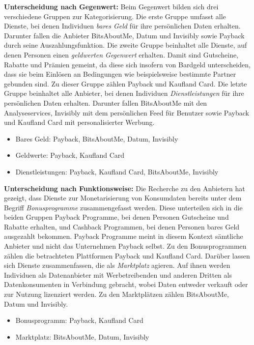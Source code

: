 \noindent \textbf{Unterscheidung nach Gegenwert:} Beim Gegenwert bilden sich drei verschiedene Gruppen zur Kategorisierung. Die erste Gruppe umfasst alle Dienste, bei denen Individuen \textit{bares Geld} für ihre persönlichen Daten erhalten. Darunter fallen die Anbieter BitsAboutMe, Datum und Invisibly sowie Payback durch seine Auszahlungsfunktion. Die zweite Gruppe beinhaltet alle Dienste, auf denen Personen einen \textit{geldwerten Gegenwert} erhalten. Damit sind Gutscheine, Rabatte und Prämien gemeint, da diese sich insofern von Bardgeld unterscheiden, dass sie beim Einlösen an Bedingungen wie beispielsweise bestimmte Partner gebunden sind. Zu dieser Gruppe zählen Payback und Kaufland Card. Die letzte Gruppe beinhaltet alle Anbieter, bei denen Individuen \textit{Dienstleistungen} für ihre persönlichen Daten erhalten. Darunter fallen BitsAboutMe mit den Analyseservices, Invisibly mit dem persönlichen Feed für Benutzer sowie Payback und Kaufland Card mit personalisierter Werbung.
\begin{itemize}
    \item Bares Geld: Payback, BitsAboutMe, Datum, Invisibly
    \item Geldwerte: Payback, Kaufland Card
    \item Dienstleistungen: Payback, Kaufland Card, BitsAboutMe, Invisibly
\end{itemize}

\noindent \textbf{Unterscheidung nach Funktionsweise:} Die Recherche zu den Anbietern hat gezeigt, dass Dienste zur Monetarisierung von Konsumdaten bereits unter dem Begriff \textit{Bonusprogramme} zusammengefasst werden. Diese unterteilen sich in die beiden Gruppen Payback Programme, bei denen Personen Gutscheine und Rabatte erhalten, und Cashback Programmen, bei denen Personen bares Geld ausgezahlt bekommen. Payback Programme meint in diesem Kontext sämtliche Anbieter und nicht das Unternehmen Payback selbst. Zu den Bonusprogrammen zählen die betrachteten Plattformen Payback und Kaufland Card. Darüber lassen sich Dienste zusammenfassen, die als \textit{Marktplatz} agieren. Auf ihnen werden Individuen als Datenanbieter mit Werbetreibenden und anderen Dritten als Datenkonsumenten in Verbindung gebracht, wobei Daten entweder verkauft oder zur Nutzung lizenziert werden. Zu den Marktplätzen zählen BitsAboutMe, Datum und Invisibly.
\begin{itemize}
    \item Bonusprogramm: Payback, Kaufland Card
    \item Marktplatz: BitsAboutMe, Datum, Invisibly
\end{itemize}

